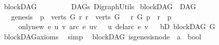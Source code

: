 %
\begin{isabellebody}%
%
%
\isadelimtheory
\isanewline
\isanewline
%
\endisadelimtheory
%
\isatagtheory
{}\isamarkupfalse%
\ blockDAG\ \ \ \ \ \ \isanewline
\ \ \ DAGs\ DigraphUtils\isanewline
{}%
\endisatagtheory
{\isafoldtheory}%
%
\isadelimtheory
%
\endisadelimtheory
%
\isadelimdocument
%
\endisadelimdocument
%
\isatagdocument
%
\isamarkuptrue%
%
\endisatagdocument
{\isafolddocument}%
%
\isadelimdocument
%
\endisadelimdocument
{}\isamarkupfalse%
\ blockDAG\ {\isacharequal}{\kern0pt}\ DAG\ \ {\isacharplus}{\kern0pt}\isanewline
\ \ \ genesis{\isacharcolon}{\kern0pt}\ \ {\isachardoublequoteopen}{\isasymexists}p\ {\isasymin}\ verts\ G{\isachardot}{\kern0pt}\ {\isasymforall}r{\isachardot}{\kern0pt}\ r\ {\isasymin}\ verts\ G\ \ {\isasymlongrightarrow}\ {\isacharparenleft}{\kern0pt}r\ {\isasymrightarrow}\isactrlsup {\isacharplus}{\kern0pt}\isactrlbsub G\isactrlesub \ p\ {\isasymor}\ r\ {\isacharequal}{\kern0pt}\ p{\isacharparenright}{\kern0pt}{\isachardoublequoteclose}\ \ \ \ \ \ \ \isanewline
\ \ \ \ \ only{\isacharunderscore}{\kern0pt}new{\isacharcolon}{\kern0pt}\ {\isachardoublequoteopen}{\isasymforall}e\ u\ v{\isachardot}{\kern0pt}\ arc\ e\ {\isacharparenleft}{\kern0pt}u{\isacharcomma}{\kern0pt}v{\isacharparenright}{\kern0pt}\ {\isasymlongrightarrow}\ {\isasymnot}\ {\isacharparenleft}{\kern0pt}u\ {\isasymrightarrow}\isactrlsup {\isacharplus}{\kern0pt}\isactrlbsub {\isacharparenleft}{\kern0pt}del{\isacharunderscore}{\kern0pt}arc\ e{\isacharparenright}{\kern0pt}\isactrlesub \ v{\isacharparenright}{\kern0pt}{\isachardoublequoteclose}\isanewline
{}\ \isanewline
\isanewline
{}\isamarkupfalse%
\ bD{\isacharcolon}{\kern0pt}\ {\isachardoublequoteopen}blockDAG\ G{\isachardoublequoteclose}%
\isadelimproof
\ %
\endisadelimproof
%
\isatagproof
{}\isamarkupfalse%
\ blockDAG{\isacharunderscore}{\kern0pt}axioms\ \isamarkupfalse%
\ simp%
\endisatagproof
{\isafoldproof}%
%
\isadelimproof
%
\endisadelimproof
\isanewline
\isanewline
{}\isamarkupfalse%
%
\isadelimdocument
%
\endisadelimdocument
%
\isatagdocument
%
\isamarkuptrue%
%
\endisatagdocument
{\isafolddocument}%
%
\isadelimdocument
%
\endisadelimdocument
{}\isamarkupfalse%
\ {\isacharparenleft}{\kern0pt}\ blockDAG{\isacharparenright}{\kern0pt}\ is{\isacharunderscore}{\kern0pt}genesis{\isacharunderscore}{\kern0pt}node\ {\isacharcolon}{\kern0pt}{\isacharcolon}{\kern0pt}\ {\isachardoublequoteopen}{\isacharprime}{\kern0pt}a\ {\isasymRightarrow}\ bool{\isachardoublequoteclose}\ \isanewline

\end{isabellebody}
